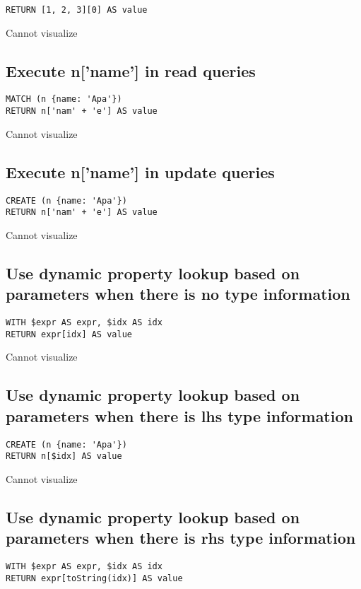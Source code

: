 \begin{lstlisting}
RETURN [1, 2, 3][0] AS value
\end{lstlisting}

Cannot visualize
\subsection{Execute n['name'] in read queries}

\begin{lstlisting}
MATCH (n {name: 'Apa'})
RETURN n['nam' + 'e'] AS value
\end{lstlisting}

Cannot visualize
\subsection{Execute n['name'] in update queries}

\begin{lstlisting}
CREATE (n {name: 'Apa'})
RETURN n['nam' + 'e'] AS value
\end{lstlisting}

Cannot visualize
\subsection{Use dynamic property lookup based on parameters when there is no type information}

\begin{lstlisting}
WITH $expr AS expr, $idx AS idx
RETURN expr[idx] AS value
\end{lstlisting}

Cannot visualize
\subsection{Use dynamic property lookup based on parameters when there is lhs type information}

\begin{lstlisting}
CREATE (n {name: 'Apa'})
RETURN n[$idx] AS value
\end{lstlisting}

Cannot visualize
\subsection{Use dynamic property lookup based on parameters when there is rhs type information}

\begin{lstlisting}
WITH $expr AS expr, $idx AS idx
RETURN expr[toString(idx)] AS value
\end{lstlisting}

